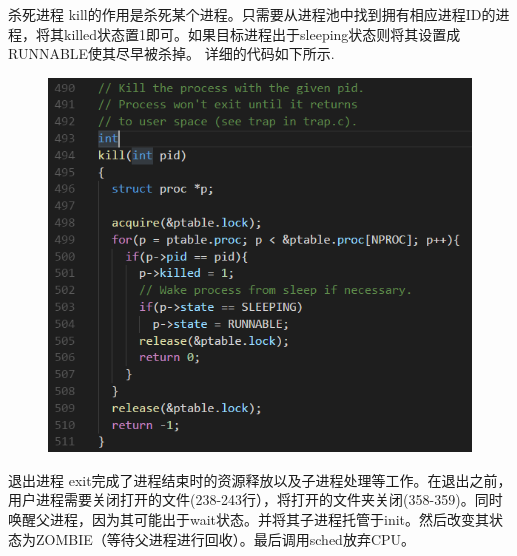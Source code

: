 \documentclass[a4paper,12pt]{report}
\begin{document}
杀死进程
kill的作用是杀死某个进程。只需要从进程池中找到拥有相应进程ID的进程，将其killed状态置1即可。如果目标进程出于sleeping状态则将其设置成RUNNABLE使其尽早被杀掉。
详细的代码如下所示.
\begin{figure}[H]
	\centering
	\includegraphics [width=1.0\textwidth]{figure//image111.png}
\end{figure}
退出进程
exit完成了进程结束时的资源释放以及子进程处理等工作。在退出之前，用户进程需要关闭打开的文件(238-243行），将打开的文件夹关闭(358-359)。同时唤醒父进程，因为其可能出于wait状态。并将其子进程托管于init。然后改变其状态为ZOMBIE（等待父进程进行回收）。最后调用sched放弃CPU。
\end{document}
